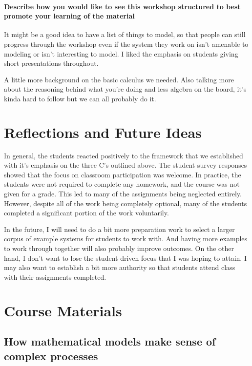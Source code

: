 \paragraph{ Describe how you would like to see this workshop structured to best promote your learning of the material }

It might be a good idea to have a list of things to model, so that people can still progress through the workshop even if the system they work on isn't amenable to modeling or isn't interesting to model. I liked the emphasis on students giving short presentations throughout. 

A little more background on the basic calculus we needed. Also talking more about the reasoning behind what you're doing and less algebra on the board, it's kinda hard to follow but we can all probably do it. 




\section{Reflections and Future Ideas}

In general, the students reacted positively to the framework that we established with it's emphasis on the three C's outlined above.  The student survey responses showed that the focus on classroom participation was welcome.  In practice, the students were not required to complete any homework, and the course was not given for a grade.  This led to many of the assignments being neglected entirely.  However, despite all of the work being completely optional, many of the students completed a significant portion of the work voluntarily.  

In the future, I will need to do a bit more preparation work to select a larger corpus of example systems for students to work with.  And having more examples to work through together will also probably improve outcomes. On the other hand, I don't want to lose the student driven focus that I was hoping to attain. I may also want to establish a bit more authority so that students attend class with their assignments completed.   


\section{Course Materials}

\subsection{How mathematical models make sense of complex processes}

